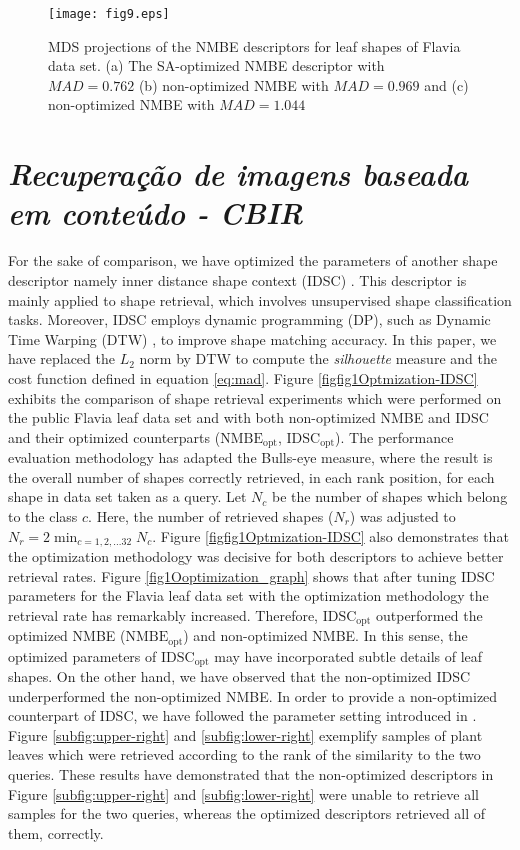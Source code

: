 {{\begin{figure}[h!]
\centering
\texttt{[image: fig9.eps]}
 \caption{\label{MDS:Leaves} MDS projections of the NMBE descriptors for leaf shapes of Flavia data set. (a) The SA-optimized NMBE descriptor with $MAD = 0.762$ (b) non-optimized NMBE with $MAD =0.969$ and (c) non-optimized NMBE with $MAD = 1.044$ }
\end{figure}
\section{\emph{Recuperação de imagens baseada em conteúdo - CBIR}}}
For the sake of comparison, we have optimized the parameters of another shape descriptor namely inner distance shape context (IDSC) .
This descriptor is mainly applied to shape retrieval, which involves unsupervised shape classification tasks.  Moreover, IDSC employs dynamic programming (DP), such as Dynamic Time Warping (DTW) , to improve shape matching accuracy. In this paper, we have replaced the $L_2$ norm by DTW to compute the \emph{silhouette} measure and the cost function defined in equation \ref{eq:mad}.  
Figure \ref{figfig1Optmization-IDSC} exhibits the comparison of shape retrieval experiments which were performed on the public Flavia leaf data set and with both non-optimized NMBE and IDSC and their optimized counterparts ($\operatorname{NMBE_{opt}}$, $\operatorname{IDSC_{opt}}$).
The performance evaluation methodology has adapted the Bulls-eye measure, where the result is the overall number of shapes correctly  retrieved, in each rank position, for each shape in data set taken as a query.  Let $N_c$ be the number of shapes which belong to the class $c$. Here, the number of retrieved shapes ($N_r$) was adjusted to $N_r = 2\displaystyle \min_{c = 1,2,\dots 32}{N_c}$. Figure \ref{figfig1Optmization-IDSC} also demonstrates that the optimization methodology was decisive for both descriptors to achieve better retrieval rates. 
Figure \ref{fig1Ooptimization_graph}  shows that after tuning IDSC parameters for the Flavia leaf data set with the optimization methodology the retrieval rate has remarkably increased. Therefore, $\operatorname{IDSC_{opt}}$  outperformed the optimized NMBE ($\operatorname{NMBE_{opt}}$) and non-optimized NMBE. In this sense, the optimized parameters of $\operatorname{IDSC_{opt}}$ may have incorporated subtle details of leaf shapes. On the other hand, we have observed that the non-optimized IDSC underperformed the non-optimized NMBE. 
In order to provide a non-optimized counterpart of IDSC, we have followed the parameter setting introduced in .
Figure \ref{subfig:upper-right} and \ref{subfig:lower-right} exemplify samples of  plant leaves which were retrieved according to the rank of the similarity to the two queries. These results have demonstrated that the non-optimized descriptors in Figure \ref{subfig:upper-right} and \ref{subfig:lower-right} were unable to retrieve all samples for the two queries, whereas the  optimized descriptors retrieved all of them, correctly.

}
